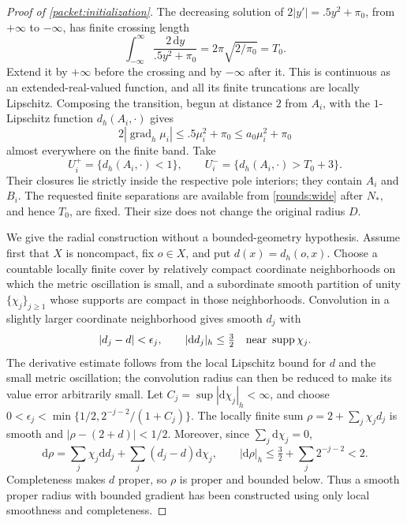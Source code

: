 \documentclass[11pt]{article}
\numberwithin{equation}{section}
\theoremstyle{definition}
\theoremstyle{remark}
\begin{document}
\begin{proof}[Proof of \cref{packet:initialization}]
The decreasing solution of
$2|y'|=.5y^2+\pi_0$, from $+\infty$ to $-\infty$, has finite
crossing length
\[
 \int_{-\infty}^{\infty}\frac{2\,\mathrm d y}{.5y^2+\pi_0}
       =2\pi\sqrt{2/\pi_0}=T_0.
\]
Extend it by $+\infty$ before the crossing and by $-\infty$ after
it.  This is continuous as an extended-real-valued function, and
all its finite truncations are locally Lipschitz.  Composing the
transition, begun at distance $2$ from $A_i$, with the $1$-Lipschitz
function $d_h(A_i,\cdot)$ gives
\[
 2|\operatorname{grad}_h\mu_i|\le .5\mu_i^2+\pi_0
                    \le a_0\mu_i^2+\pi_0
\]
almost everywhere on the finite band.  Take
\[
 U_i^+=\{d_h(A_i,\cdot)<1\},\qquad
 U_i^-=\{d_h(A_i,\cdot)>T_0+3\}.
\]
Their closures lie strictly inside the respective pole interiors;
they contain $A_i$ and $B_i$.  The requested finite separations are
available from \cref{rounds:wide} after $N_*$, and hence $T_0$, are
fixed.  Their size does not change the original radius $D$.

We give the radial construction without a bounded-geometry
hypothesis.  Assume first that $X$ is noncompact, fix $o\in X$, and
put $d(x)=d_h(o,x)$.  Choose a countable locally finite cover by
relatively compact coordinate neighborhoods on which the metric
oscillation is small, and a subordinate smooth partition of unity
$\{\chi_j\}_{j\ge1}$ whose supports are compact in those neighborhoods.
Convolution in a slightly larger coordinate neighborhood gives
smooth $d_j$ with
\[
 |d_j-d|<\epsilon_j,\qquad |\mathrm d d_j|_h\le\tfrac32
       \quad\hbox{near }\operatorname{supp}\chi_j.
\]
The derivative estimate follows from the local Lipschitz bound for
$d$ and the small metric oscillation; the convolution radius can
then be reduced to make its value error arbitrarily small.
Let $C_j=\sup|\mathrm d\chi_j|_h<\infty$, and choose
$0<\epsilon_j<\min\{1/2,2^{-j-2}/(1+C_j)\}$.
The locally finite sum $\rho=2+\sum_j\chi_jd_j$ is smooth and
$|\rho-(2+d)|<1/2$.  Moreover, since $\sum_j\mathrm d\chi_j=0$,
\[
 \mathrm d\rho=\sum_j\chi_j\mathrm d d_j
             +\sum_j(d_j-d)\mathrm d\chi_j,
 \qquad |\mathrm d\rho|_h\le\tfrac32+\sum_j2^{-j-2}<2.
\]
Completeness makes $d$ proper, so $\rho$ is proper and bounded below.
Thus a smooth proper radius with bounded gradient has been constructed
using only local smoothness and completeness.


\end{proof}
\end{document}
